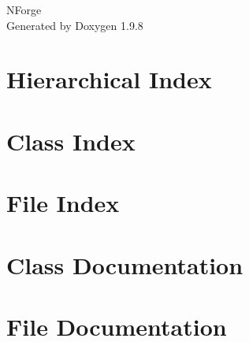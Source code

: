 \documentclass[twoside]{book}
\newcommand{\+}{\discretionary{\mbox{\scriptsize$\hookleftarrow$}}{}{}}
\newcommand{\clearemptydoublepage}{%
    \newpage{\pagestyle{empty}\cleardoublepage}%
  }
\begin{document}
  \raggedbottom
    \hypersetup{pageanchor=false,
                bookmarksnumbered=true,
                pdfencoding=unicode
               }
  \begin{titlepage}
  \vspace*{7cm}
  \begin{center}%
  {\Large NForge}\\
  \vspace*{1cm}
  {\large Generated by Doxygen 1.9.8}\\
  \end{center}
  \end{titlepage}
  \clearemptydoublepage
  \tableofcontents
  \clearemptydoublepage
  \hypersetup{pageanchor=true}

\chapter{Hierarchical Index}

\chapter{Class Index}

\chapter{File Index}

\chapter{Class Documentation}














\chapter{File Documentation}













  \backmatter
  \newpage
  \clearemptydoublepage
  \printindex
\end{document}
